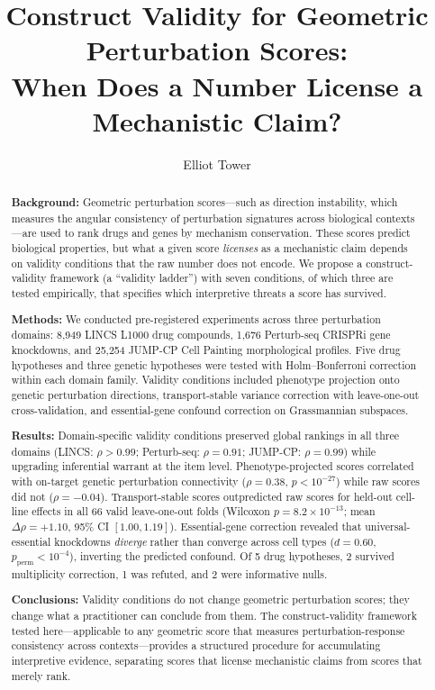 \documentclass[11pt]{article}
\title{Construct Validity for Geometric Perturbation Scores:\\ When Does a Number License a Mechanistic Claim?}
\author{Elliot Tower}
\affil{Independent researcher \\ \texttt{elliot@elliottower.ai}}
\date{}
\begin{document}
\maketitle

\begin{abstract}
\textbf{Background:}
Geometric perturbation scores---such as direction instability, which
measures the angular consistency of perturbation signatures across
biological contexts---are used to rank drugs and genes by mechanism
conservation. These scores predict biological properties, but what
a given score \emph{licenses} as a mechanistic claim depends on
validity conditions that the raw number does not encode. We
propose a construct-validity framework (a ``validity ladder'') with
seven conditions, of which three are tested empirically, that
specifies which interpretive threats a score has survived.

\textbf{Methods:}
We conducted pre-registered experiments across three perturbation
domains: 8{,}949 LINCS L1000 drug compounds, 1{,}676 Perturb-seq
CRISPRi gene knockdowns, and 25{,}254 JUMP-CP Cell Painting
morphological profiles. Five drug hypotheses and three genetic
hypotheses were tested with Holm--Bonferroni correction within each
domain family. Validity conditions included phenotype projection
onto genetic perturbation directions, transport-stable variance
correction with leave-one-out cross-validation, and essential-gene
confound correction on Grassmannian subspaces.

\textbf{Results:}
Domain-specific validity conditions preserved global rankings in all
three domains (LINCS: $\rho > 0.99$; Perturb-seq: $\rho = 0.91$;
JUMP-CP: $\rho = 0.99$) while upgrading inferential warrant at the
item level. Phenotype-projected scores correlated with on-target
genetic perturbation connectivity ($\rho = 0.38$, $p < 10^{-27}$)
while raw scores did not ($\rho = -0.04$). Transport-stable scores
outpredicted raw scores for held-out cell-line effects in all 66
valid leave-one-out folds (Wilcoxon $p = 8.2 \times 10^{-13}$;
mean $\Delta\rho = +1.10$, 95\% CI $[1.00, 1.19]$). Essential-gene
correction revealed that universal-essential knockdowns
\emph{diverge} rather than converge across cell types ($d = 0.60$,
$p_{\text{perm}} < 10^{-4}$), inverting the predicted confound.
Of 5 drug hypotheses, 2 survived multiplicity correction, 1 was
refuted, and 2 were informative nulls.

\textbf{Conclusions:}
Validity conditions do not change geometric perturbation scores;
they change what a practitioner can conclude from them. The
construct-validity framework tested here---applicable to any
geometric score that measures perturbation-response consistency
across contexts---provides a structured procedure for accumulating
interpretive evidence, separating scores that license mechanistic
claims from scores that merely rank.
\end{abstract}
\end{document}
